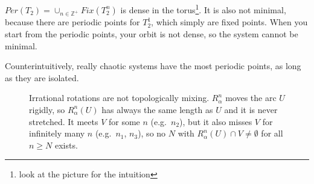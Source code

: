 \begin{observation}
    $Per(T_2)=\cup_{n\in\mathbb{Z}^+}Fix(T_2^n)$ is dense in the torus\footnote{look at the picture for the intuition}. It is also not minimal, because there are periodic points for $T^1_2$, which simply are fixed points. When you start from the periodic points, your orbit is not dense, so the system cannot be minimal.
\end{observation}

Counterintuitively, really chaotic systems have the most periodic points, as long as they are isolated.

\begin{figure}[ht]
    \centering
    \caption{Irrational rotations are not topologically mixing. $R_\alpha^n$ moves the arc $U$
    rigidly, so $R_\alpha^n(U)$ has always the same length as $U$ and it is never stretched.
    It meets $V$ for some $n$ (e.g.\ $n_2$), but it also misses $V$ for infinitely many $n$
    (e.g.\ $n_1$, $n_3$), so no $N$ with $R_\alpha^n(U)\cap V\neq\emptyset$ for all $n\geq N$ exists.}
    \label{fig:rotation_not_mixing}
\end{figure}

